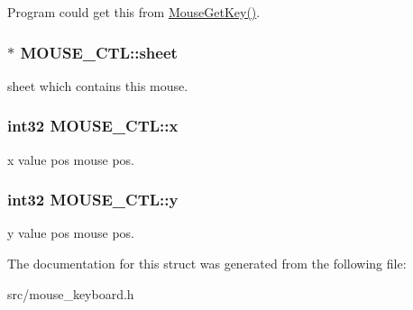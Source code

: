 Program could get this from \hyperlink{mouse__keyboard_8c_a01ccca89f78ef807bb021f66fe1addaf}{Mouse\+Get\+Key()}. \hypertarget{struct_m_o_u_s_e___c_t_l_ab7257a50dfc91c78666621e0af7bbbe7}{}
\subsubsection[{sheet}]{$\ast$ M\+O\+U\+S\+E\+\_\+\+C\+T\+L\+::sheet}\label{struct_m_o_u_s_e___c_t_l_ab7257a50dfc91c78666621e0af7bbbe7}


sheet which contains this mouse. 

\hypertarget{struct_m_o_u_s_e___c_t_l_aa56dc48b53502faff745181e13a3ccfc}{}
\subsubsection[{x}]{\setlength{\rightskip}{0pt plus 5cm}int32 M\+O\+U\+S\+E\+\_\+\+C\+T\+L\+::x}\label{struct_m_o_u_s_e___c_t_l_aa56dc48b53502faff745181e13a3ccfc}


x value pos mouse pos. 

\hypertarget{struct_m_o_u_s_e___c_t_l_add9dc2e15464a86ea8e87d04dff862fb}{}
\subsubsection[{y}]{\setlength{\rightskip}{0pt plus 5cm}int32 M\+O\+U\+S\+E\+\_\+\+C\+T\+L\+::y}\label{struct_m_o_u_s_e___c_t_l_add9dc2e15464a86ea8e87d04dff862fb}


y value pos mouse pos. 



The documentation for this struct was generated from the following file\+:\begin{DoxyCompactItemize}
\item 
src/mouse\+\_\+keyboard.\+h\end{DoxyCompactItemize}
